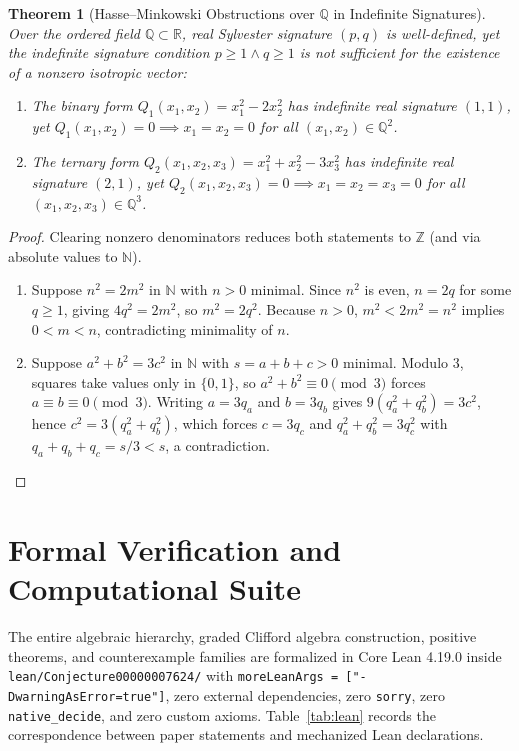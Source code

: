 \documentclass[11pt]{article}
\newtheorem{theorem}{Theorem}[section]
\theoremstyle{definition}
\newcommand{\R}{\mathbb{R}}
\newcommand{\Q}{\mathbb{Q}}
\newcommand{\Z}{\mathbb{Z}}
\begin{document}
\begin{theorem}[Hasse--Minkowski Obstructions over $\Q$ in Indefinite Signatures]\label{thm:hasse}
Over the ordered field $\Q \subset \R$, real Sylvester signature $(p, q)$ is well-defined,
yet the indefinite signature condition $p \ge 1 \land q \ge 1$ is \emph{not} sufficient
for the existence of a nonzero isotropic vector:
\begin{enumerate}
  \item The binary form $Q_1(x_1, x_2) = x_1^2 - 2 x_2^2$ has indefinite real signature
    $(1, 1)$, yet $Q_1(x_1, x_2) = 0 \implies x_1 = x_2 = 0$ for all $(x_1, x_2) \in \Q^2$.
  \item The ternary form $Q_2(x_1, x_2, x_3) = x_1^2 + x_2^2 - 3 x_3^2$ has indefinite
    real signature $(2, 1)$, yet $Q_2(x_1, x_2, x_3) = 0 \implies x_1 = x_2 = x_3 = 0$
    for all $(x_1, x_2, x_3) \in \Q^3$.
\end{enumerate}
\end{theorem}
\begin{proof}
Clearing nonzero denominators reduces both statements to $\Z$ (and via absolute values to
$\mathbb{N}$).
\begin{enumerate}
  \item Suppose $n^2 = 2 m^2$ in $\mathbb{N}$ with $n > 0$ minimal. Since $n^2$ is even,
    $n = 2q$ for some $q \ge 1$, giving $4q^2 = 2m^2$, so $m^2 = 2q^2$. Because $n > 0$,
    $m^2 < 2m^2 = n^2$ implies $0 < m < n$, contradicting minimality of $n$.
  \item Suppose $a^2 + b^2 = 3 c^2$ in $\mathbb{N}$ with $s = a + b + c > 0$ minimal.
    Modulo $3$, squares take values only in $\{0, 1\}$, so $a^2 + b^2 \equiv 0 \pmod 3$
    forces $a \equiv b \equiv 0 \pmod 3$. Writing $a = 3 q_a$ and $b = 3 q_b$ gives
    $9(q_a^2 + q_b^2) = 3 c^2$, hence $c^2 = 3(q_a^2 + q_b^2)$, which forces $c = 3 q_c$
    and $q_a^2 + q_b^2 = 3 q_c^2$ with $q_a + q_b + q_c = s/3 < s$, a contradiction. \qedhere
\end{enumerate}
\end{proof}

\section{Formal Verification and Computational Suite}

The entire algebraic hierarchy, graded Clifford algebra construction, positive theorems,
and counterexample families are formalized in Core Lean 4.19.0 inside
\texttt{lean/Conjecture00000007624/} with \texttt{moreLeanArgs = ["-DwarningAsError=true"]},
zero external dependencies, zero \texttt{sorry}, zero \texttt{native\_decide}, and zero
custom axioms. Table~\ref{tab:lean} records the correspondence between paper statements
and mechanized Lean declarations.
\end{document}
